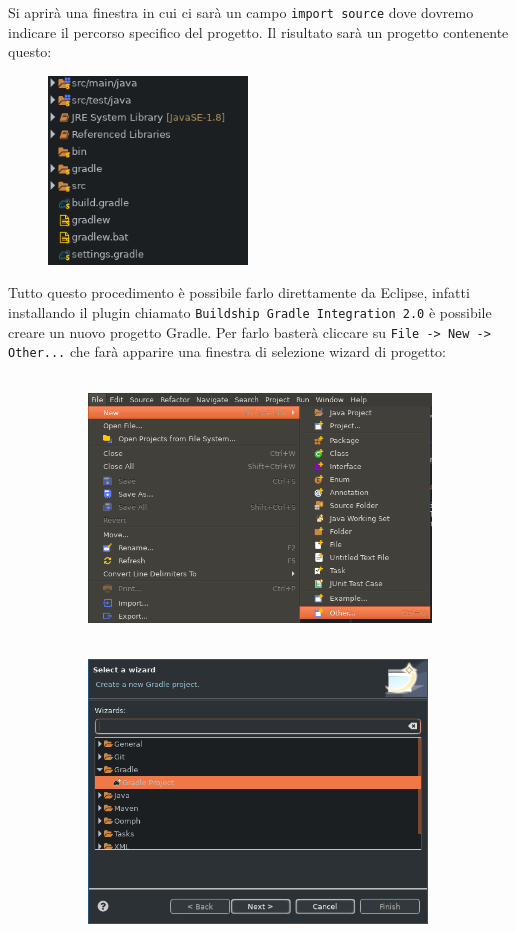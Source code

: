 Si aprirà una finestra in cui ci sarà un campo \texttt{import source} dove dovremo indicare il percorso specifico del progetto. Il risultato sarà un progetto contenente questo:
\begin{figure}[H]
    \centering
    \includegraphics[width=0.4\linewidth, height=5cm]{3DependencyManagement/eclipsePlugin/resultProject.png}
\end{figure}
Tutto questo procedimento è possibile farlo direttamente da Eclipse, infatti installando il plugin chiamato \texttt{Buildship Gradle Integration 2.0} è possibile creare un nuovo progetto Gradle. Per farlo basterà cliccare su \texttt{File -> New -> Other...} che farà apparire una finestra di selezione wizard di progetto:
\begin{figure}[H]
\begin{subfigure}{0.5\textwidth}
\includegraphics[width=0.9\linewidth, height=7cm]{3DependencyManagement/eclipsePlugin/newProject.png}
\end{subfigure}
\begin{subfigure}{0.5\textwidth}
\includegraphics[width=0.9\linewidth, height=7cm]{3DependencyManagement/eclipsePlugin/wizardGradle.png}
\end{subfigure}
\end{figure}
